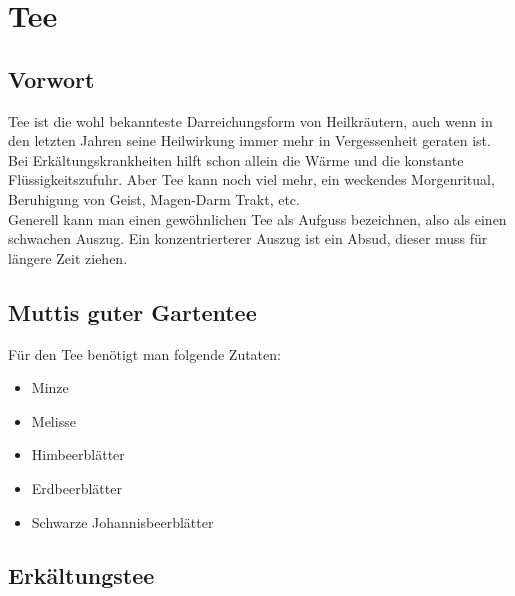\chapter{Tee}
\label{   }

\section{Vorwort}
\label{   }

Tee ist die wohl bekannteste Darreichungsform von Heilkräutern, auch wenn in den letzten Jahren seine Heilwirkung immer mehr in Vergessenheit geraten ist. Bei Erkältungskrankheiten hilft schon allein die Wärme und die konstante Flüssigkeitszufuhr. Aber Tee kann noch viel mehr, ein weckendes Morgenritual, Beruhigung von Geist, Magen-Darm Trakt, etc.\\

Generell kann man einen gewöhnlichen Tee als Aufguss bezeichnen, also als einen schwachen Auszug. Ein konzentrierterer Auszug ist ein Absud, dieser muss für längere Zeit ziehen.\\


\newpage


\section{Muttis guter Gartentee}
\label{   }



Für den Tee benötigt man folgende Zutaten:

\begin{itemize}
	\item Minze
	\item Melisse
	\item Himbeerblätter
	\item Erdbeerblätter
	\item Schwarze Johannisbeerblätter
\end{itemize}


\newpage

\section{Erkältungstee}
\label{   }

